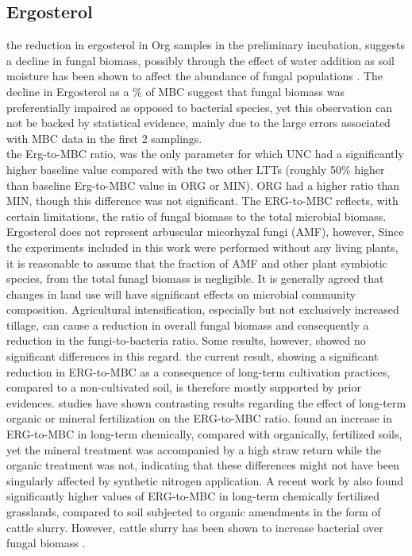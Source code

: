 	\subsection{Ergosterol}
	the reduction in ergosterol in Org samples in the preliminary incubation, suggests a decline in fungal biomass, possibly through the effect of water addition as soil moisture has been shown to affect the abundance of fungal populations \citep{drenovsky2004, griffin1963}. The decline in Ergosterol as a \% of MBC suggest that fungal biomass was preferentially impaired as opposed to bacterial species, yet this observation can not be backed by statistical evidence, mainly due to the large errors associated with MBC data in the first 2 samplings.\\
	the Erg-to-MBC ratio, was the only parameter for which UNC had a significantly higher baseline value compared with the two other LTTs (roughly 50\% higher than baseline Erg-to-MBC value in ORG or MIN).
	ORG had a higher ratio than MIN, though this difference was not significant. The ERG-to-MBC reflects, with certain limitations, the ratio of fungal biomass to the total microbial biomass. Ergosterol does not represent arbuscular micorhyzal fungi (AMF), however, Since the experiments included in this work were performed without any living plants, it is reasonable to assume that the fraction of AMF and other plant symbiotic species, from the total funagl biomass is negligible.
	It is generally agreed that changes in land use will have significant effects on microbial community composition. Agricultural intensification, especially but not exclusively increased tillage, can cause a reduction in overall fungal biomass and consequently a reduction in the fungi-to-bacteria ratio. Some results, however, showed no significant differences in this regard.
	the current result, showing a significant reduction in ERG-to-MBC as a consequence of long-term cultivation practices, compared to a non-cultivated soil, is therefore mostly supported by prior evidences.
	studies have shown contrasting results regarding the effect of long-term organic or mineral fertilization on the ERG-to-MBC ratio. \citet{heinze2010} found an increase in ERG-to-MBC in long-term chemically, compared with organically, fertilized soils, yet the mineral treatment was accompanied by a high straw return while the organic treatment was not, indicating that these differences might not have been  singularly affected by synthetic nitrogen application. A recent work by \citet{knoblauch2017} also found significantly higher values of ERG-to-MBC in long-term chemically fertilized grasslands, compared to soil subjected to organic amendments in the form of cattle slurry. However, cattle slurry has been shown to increase bacterial over fungal biomass \citet{knoblauch2017}.
